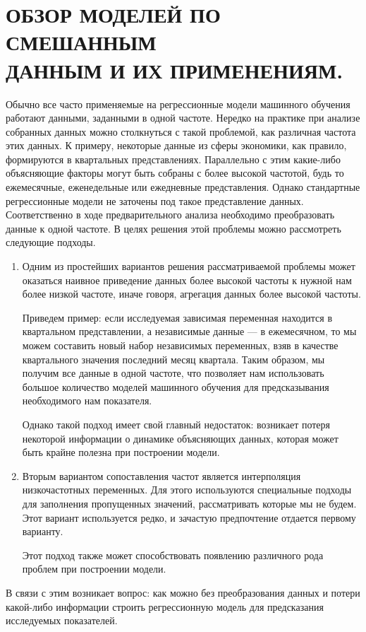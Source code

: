 \documentclass[a4paper, 14pt]{extarticle}
\begin{document}
	\section{ОБЗОР МОДЕЛЕЙ ПО СМЕШАННЫМ \\ДАННЫМ И ИХ ПРИМЕНЕНИЯМ.}
	Обычно все часто применяемые на регрессионные модели машинного обучения работают данными, заданными в одной частоте. Нередко на практике при анализе собранных данных можно столкнуться с такой проблемой, как различная частота этих данных. К примеру, некоторые данные из сферы экономики, как правило, формируются в квартальных представлениях. Параллельно с этим какие-либо объясняющие факторы могут быть собраны с более высокой частотой, будь то ежемесячные, еженедельные или ежедневные представления. Однако стандартные регрессионные модели не заточены под такое представление данных. Соответственно в ходе предварительного анализа необходимо преобразовать данные к одной частоте. В целях решения этой проблемы можно рассмотреть следующие подходы.
	\begin{enumerate}
		\item Одним из простейших вариантов решения рассматриваемой проблемы может оказаться наивное приведение данных более высокой частоты к нужной нам более низкой частоте, иначе говоря, агрегация данных более высокой частоты. 
		
		Приведем пример: если исследуемая зависимая переменная находится в квартальном представлении, а независимые данные --- в ежемесячном, то мы можем составить новый набор независимых переменных, взяв в качестве квартального значения последний месяц квартала. Таким образом, мы получим все данные в одной частоте, что позволяет нам использовать большое количество моделей машинного обучения для предсказывания необходимого нам показателя.
		
		Однако такой подход имеет свой главный недостаток:
		возникает потеря некоторой информации о динамике объясняющих данных, которая может быть крайне полезна при построении модели.
		\item Вторым вариантом сопоставления частот является интерполяция низкочастотных
		переменных. Для этого используются специальные подходы для заполнения пропущенных значений, рассматривать которые мы не будем. Этот вариант используется редко, и зачастую предпочтение отдается первому варианту.
		
		Этот подход также может способствовать появлению различного рода проблем при построении модели.
	\end{enumerate}
	В связи с этим возникает вопрос: как можно без преобразования данных и потери какой-либо информации строить регрессионную модель для предсказания исследуемых показателей. 
	
\end{document}
